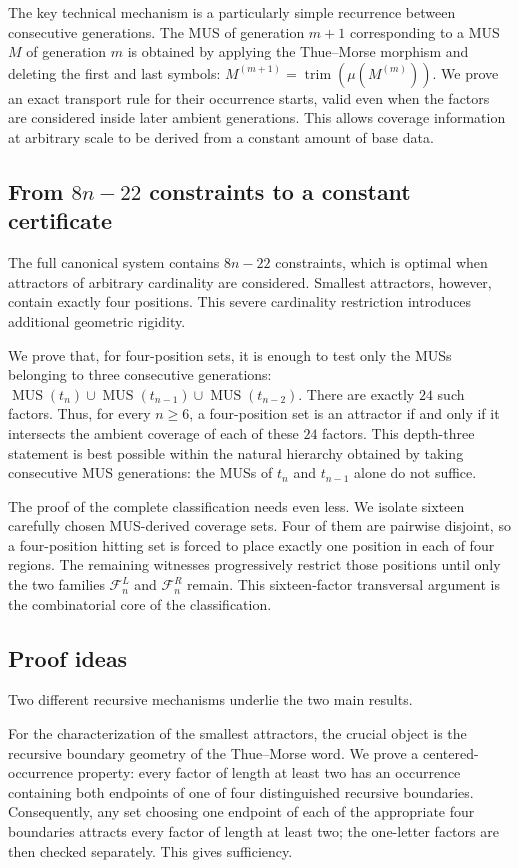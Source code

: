 \documentclass[11pt,a4paper]{article}
\theoremstyle{definition}\newtheorem{definition}[theorem]{Definition}
\theoremstyle{remark}\newtheorem{remark}[theorem]{Remark}
\newcommand{\MUS}{\operatorname{MUS}}
\newcommand{\FL}{\mathcal{F}^{L}}
\newcommand{\FR}{\mathcal{F}^{R}}
\begin{document}
The key technical mechanism is a particularly simple recurrence between consecutive generations. The MUS of generation $m+1$ corresponding to a MUS $M$ of generation $m$ is obtained by applying the Thue--Morse morphism and deleting the first and last symbols:
$
M^{(m+1)}=\operatorname{trim}\!\left(\mu(M^{(m)})\right).
$
We prove an exact transport rule for their occurrence starts, valid even when the factors are considered inside later ambient generations. This allows coverage information at arbitrary scale to be derived from a constant amount of base data.

\subsection{From \texorpdfstring{$8n-22$}{8n-22} constraints to a constant certificate}
The full canonical system contains $8n-22$ constraints, which is optimal when attractors of arbitrary cardinality are considered. Smallest attractors, however, contain exactly four positions. This severe cardinality restriction introduces additional geometric rigidity.

We prove that, for four-position sets, it is enough to test only the MUSs belonging to three consecutive generations:
$
\MUS(t_n)\cup\MUS(t_{n-1})\cup\MUS(t_{n-2}).
$
There are exactly $24$ such factors. Thus, for every $n\geq6$, a four-position set is an attractor if and only if it intersects the ambient coverage of each of these $24$ factors. This depth-three statement is best possible within the natural hierarchy obtained by taking consecutive MUS generations: the MUSs of $t_n$ and $t_{n-1}$ alone do not suffice.

The proof of the complete classification needs even less. We isolate sixteen carefully chosen MUS-derived coverage sets. Four of them are pairwise disjoint, so a four-position hitting set is forced to place exactly one position in each of four regions. The remaining witnesses progressively restrict those positions until only the two families $\FL_n$ and $\FR_n$ remain. This sixteen-factor transversal argument is the combinatorial core of the classification.

\subsection{Proof ideas}
Two different recursive mechanisms underlie the two main results.

For the characterization of the smallest attractors, the crucial object is the recursive boundary geometry of the Thue--Morse word. We prove a centered-occurrence property: every factor of length at least two has an occurrence containing both endpoints of one of four distinguished recursive boundaries. Consequently, any set choosing one endpoint of each of the appropriate four boundaries attracts every factor of length at least two; the one-letter factors are then checked separately. This gives sufficiency.
\end{document}

